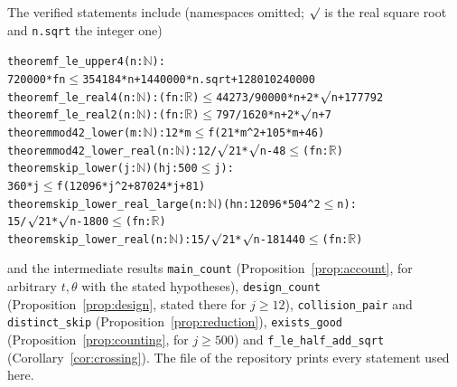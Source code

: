 \documentclass[11pt]{amsart}
\theoremstyle{remark}
\begin{document}
The verified statements include (namespaces omitted; $\surd$ is the real square root and \texttt{n.sqrt} the integer one)
\begin{alltt}\small
theorem f_le_upper4 (n : \(\mathbb{N}\)) :
    720000 * f n \(\le\) 354184 * n + 1440000 * n.sqrt + 128010240000
theorem f_le_real4 (n : \(\mathbb{N}\)) : (f n : \(\mathbb{R}\)) \(\le\) 44273 / 90000 * n + 2 * \(\surd\)n + 177792
theorem f_le_real2 (n : \(\mathbb{N}\)) : (f n : \(\mathbb{R}\)) \(\le\) 797 / 1620 * n + 2 * \(\surd\)n + 7
theorem mod42_lower (m : \(\mathbb{N}\)) : 12 * m \(\le\) f (21 * m^2 + 105 * m + 46)
theorem mod42_lower_real (n : \(\mathbb{N}\)) : 12 / \(\surd\)21 * \(\surd\)n - 48 \(\le\) (f n : \(\mathbb{R}\))
theorem skip_lower (j : \(\mathbb{N}\)) (hj : 500 \(\le\) j) :
    360 * j \(\le\) f (12096 * j^2 + 87024 * j + 81)
theorem skip_lower_real_large (n : \(\mathbb{N}\)) (hn : 12096 * 504^2 \(\le\) n) :
    15 / \(\surd\)21 * \(\surd\)n - 1800 \(\le\) (f n : \(\mathbb{R}\))
theorem skip_lower_real (n : \(\mathbb{N}\)) : 15 / \(\surd\)21 * \(\surd\)n - 181440 \(\le\) (f n : \(\mathbb{R}\))
\end{alltt}
and the intermediate results \texttt{main\_count} (Proposition~\ref{prop:account}, for arbitrary $t,\theta$ with the stated hypotheses),
\texttt{design\_count} (Proposition~\ref{prop:design}, stated there for $j\ge12$), \texttt{collision\_pair} and \texttt{distinct\_skip}
(Proposition~\ref{prop:reduction}), \texttt{exists\_good} (Proposition~\ref{prop:counting}, for $j\ge500$) and
\texttt{f\_le\_half\_add\_sqrt} (Corollary~\ref{cor:crossing}). The file  of the repository \cite{Artifact} prints every statement used here.
\end{document}
